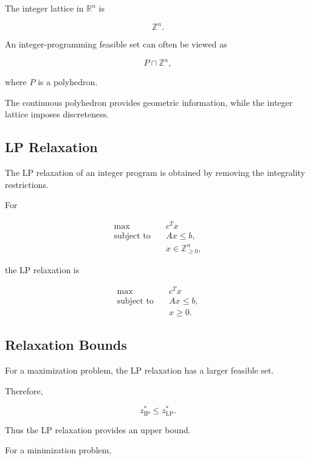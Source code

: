 The integer lattice in \(\mathbb{R}^n\) is

\[
\boxed{
\mathbb{Z}^n.
}
\]

An integer-programming feasible set can often be viewed as

\[
\boxed{
P\cap\mathbb{Z}^n,
}
\]

where \(P\) is a polyhedron.

The continuous polyhedron provides geometric information, while the
integer lattice imposes discreteness.

\subsection{LP Relaxation}
\label{subsec:integer-lp-relaxation}

The LP relaxation of an integer program is obtained by removing the
integrality restrictions.

For

\[
\boxed{
\begin{aligned}
\max
\quad&
c^Tx
\\
\text{subject to}
\quad&
Ax\leq b,
\\
&
x\in\mathbb{Z}_{\geq0}^n,
\end{aligned}
}
\]

the LP relaxation is

\[
\boxed{
\begin{aligned}
\max
\quad&
c^Tx
\\
\text{subject to}
\quad&
Ax\leq b,
\\
&
x\geq0.
\end{aligned}
}
\]

\subsection{Relaxation Bounds}
\label{subsec:integer-relaxation-bounds}

For a maximization problem, the LP relaxation has a larger feasible set.

Therefore,

\[
\boxed{
z_{\mathrm{IP}}^*
\leq
z_{\mathrm{LP}}^*.
}
\]

Thus the LP relaxation provides an upper bound.

For a minimization problem,

